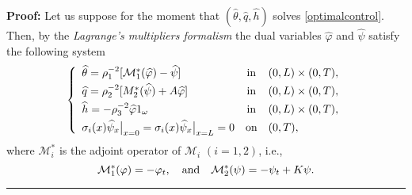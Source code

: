 \documentclass[10pt]{article}
\newenvironment{proof}[1][Proof]
{\noindent\textbf{#1:} }{\hfill\rule{0.5em}{0.5em}}
\def\om{\omega}
\def\\Phivec{\mathbf{\Phi}}
\begin{document}
\begin{proof}
	Let us suppose for the moment that $(\widehat{\theta},\widehat{q},\widehat{h})$ solves \eqref{optimalcontrol}.
	Then, by the {\it Lagrange's multipliers formalism} the dual variables $\widehat{\varphi}$
	and $\widehat{\psi}$ satisfy the following system
\begin{equation}\label{eq:lagrange_charac}
\left\{
\begin{array}{lcl}
	\widehat{\theta}=\rho_1^{-2}[\mathcal{M}_1^*(\widehat{\varphi})- \widehat{\psi}]	& \text{in}& (0,L) \times (0,T), \\
	\noalign{\smallskip}
	\widehat{q}= \rho_2^{-2}[M^*_2(\widehat{\psi})+ A\widehat{\varphi}]           	& \text{in}& (0,L) \times (0,T), \\
	\noalign{\smallskip}
	\widehat{h}=-\rho_3^{-2}\widehat{\varphi}1_\om         					& \text{in}& (0,L) \times (0,T), \\
	\noalign{\smallskip}
	\sigma_i(x)\widehat{\psi}_{x}\big|_{x=0}=\sigma_i(x)\widehat{\psi}_{x}\big|_{x=L} = 0			& \mbox{on}&	 (0,T),	\\
\end{array}
\right.
   \end{equation}
	where $\mathcal{M}_i^*$ is the adjoint operator of $\mathcal{M}_i$ $(i=1,2)$, i.e.,
$$
	\mathcal{M}_1^*(\varphi)=-\varphi_t , \quad\hbox{and}\quad \mathcal{M}_2^*(\psi)=-\psi_t  +K\psi.
$$
	

\end{proof}
\end{document}
